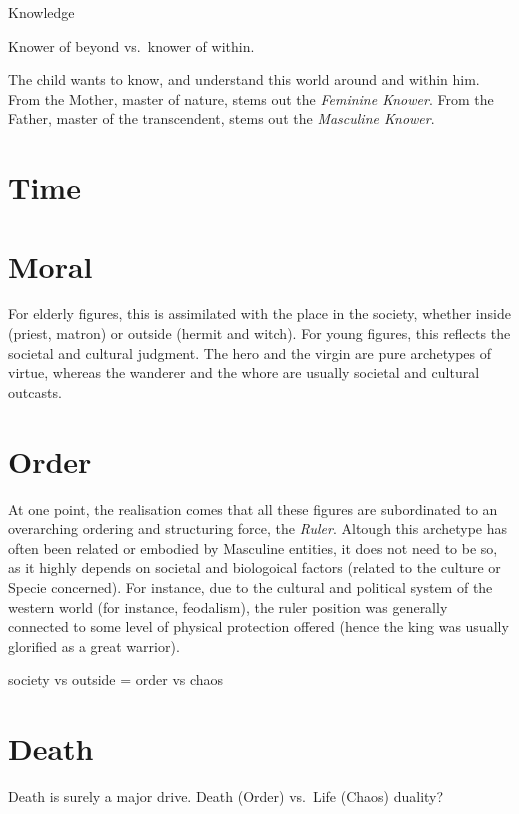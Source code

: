 \documentclass[]{book}
\begin{document}
Knowledge

Knower of beyond vs.~knower of within.

The child wants to know, and understand this world around and within him. From the Mother, master of nature, stems out the \emph{Feminine Knower}. From the Father, master of the transcendent, stems out the \emph{Masculine Knower}.

\hypertarget{time}{%
\section{Time}\label{time}}

\hypertarget{moral}{%
\section{Moral}\label{moral}}

For elderly figures, this is assimilated with the place in the society, whether inside (priest, matron) or outside (hermit and witch). For young figures, this reflects the societal and cultural judgment. The hero and the virgin are pure archetypes of virtue, whereas the wanderer and the whore are usually societal and cultural outcasts.

\hypertarget{order}{%
\section{Order}\label{order}}

At one point, the realisation comes that all these figures are subordinated to an overarching ordering and structuring force, the \emph{Ruler}. Altough this archetype has often been related or embodied by Masculine entities, it does not need to be so, as it highly depends on societal and biologoical factors (related to the culture or Specie concerned). For instance, due to the cultural and political system of the western world (for instance, feodalism), the ruler position was generally connected to some level of physical protection offered (hence the king was usually glorified as a great warrior).

society vs outside = order vs chaos

\hypertarget{death}{%
\section{Death}\label{death}}

Death is surely a major drive. Death (Order) vs.~Life (Chaos) duality?
\end{document}
